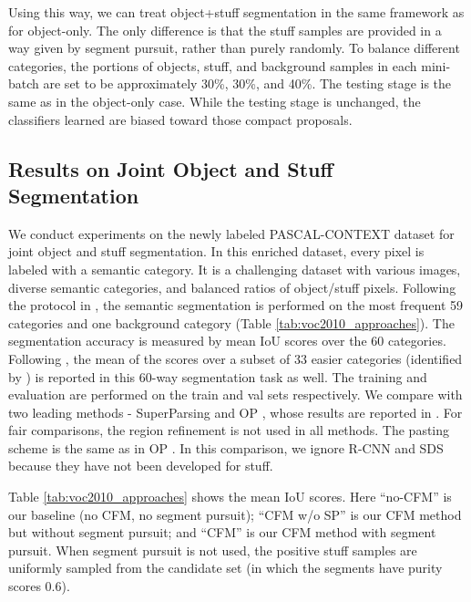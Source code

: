 \documentclass[10pt,twocolumn,letterpaper]{article}
\begin{document}
Using this way, we can treat object+stuff segmentation in the same framework as for object-only. The only difference is that the stuff samples are provided in a way given by segment pursuit, rather than purely randomly.
To balance different categories, the portions of objects, stuff, and background samples in each mini-batch are set to be approximately 30\%, 30\%, and 40\%. The testing stage is the same as in the object-only case. While the testing stage is unchanged, the classifiers learned are biased toward those compact proposals.

\subsection{Results on Joint Object and Stuff Segmentation}

We conduct experiments on the newly labeled PASCAL-CONTEXT dataset \cite{mottaghi2014role} for joint object and stuff segmentation. In this enriched dataset, every pixel is labeled with a semantic category. It is a challenging dataset with various images, diverse semantic categories, and balanced ratios of object/stuff pixels. Following the protocol in \cite{mottaghi2014role}, the semantic segmentation is performed on the most frequent 59 categories and one background category (Table \ref{tab:voc2010_approaches}). The segmentation accuracy is measured by mean IoU scores over the 60 categories. Following \cite{mottaghi2014role}, the mean of the scores over a subset of 33 easier categories (identified by \cite{mottaghi2014role}) is reported in this 60-way segmentation task as well. The training and evaluation are performed on the train and val sets respectively.
We compare with two leading methods - SuperParsing \cite{tighe2010superparsing} and OP \cite{carreira2012semantic}, whose results are reported in \cite{mottaghi2014role}. For fair comparisons, the region refinement \cite{hariharan2014simultaneous} is not used in all methods. The pasting scheme is the same as in OP \cite{carreira2012semantic}. In this comparison, we ignore R-CNN \cite{girshick2013rich} and SDS \cite{hariharan2014simultaneous} because they have not been developed for stuff.

Table \ref{tab:voc2010_approaches} shows the mean IoU scores. Here ``no-CFM'' is our baseline (no CFM, no segment pursuit); ``CFM w/o SP'' is our CFM method but without segment pursuit; and ``CFM'' is our CFM method with segment pursuit. When segment pursuit is not used, the positive stuff samples are uniformly sampled from the candidate set (in which the segments have purity scores  0.6).
\end{document}
